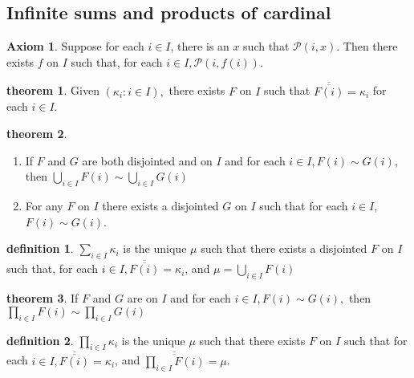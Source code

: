 \documentclass[a4paper,11pt]{article}%
\theoremstyle{remark}
\theoremstyle{definition}
\newtheorem{theorem}{theorem}[section]
\theoremstyle{definition}
\newtheorem*{definition}{definition}
\theoremstyle{plain}
\theoremstyle{definition}
\newtheorem{axiom}{Axiom}
\begin{document}
\subsection{Infinite sums and products of cardinal}
\begin{axiom}
    Suppose for each $i\in I$, there is an $x$ such that $\mathcal{P}(i,x)$.
    Then there exists $f$ on $I$ such that, for each $i\in I,\mathcal{P}(i,f(i))$.
\end{axiom}
\begin{theorem}
    Given $(\kappa_i:i\in I),$ there exists $F$ on $I$ such that $\overline{\overline{F(i)}}=\kappa_i$ for each $i\in I$.
\end{theorem}
\begin{theorem}
    \begin{enumerate}
        \item If $F$ and $G$ are both disjointed and on $I$ and for each $i\in I, F(i)\sim G(i)$,
        then $\bigcup_{i\in I}F(i)\sim \bigcup_{i\in I}G(i)$
        \item For any $F$ on $I$ there exists a disjointed $G$ on $I$ such that for each $i\in I$,$F(i)\sim G(i)$.
    \end{enumerate}
\end{theorem}
\begin{definition}
    $\sum_{i\in I}\kappa_i$ is the unique $\mu$ such that there exists a disjointed $F$ on $I$ 
    such that, for each $i\in I,\overline{\overline{F(i)}}=\kappa_i$, and $\mu=\bigcup_{i\in I}F(i)$
\end{definition}
\begin{theorem}
    If $F$ and $G$ are on $I $ and for each $i\in I, F(i)\sim G(i), $ then $\prod_{i\in I}F(i)\sim \prod_{i\in I}G(i)$
\end{theorem}
\begin{definition}
    $\prod_{i\in I}\kappa_i$ is the unique $\mu$ such that there exists $F$ on $I$ such that for each $i\in I, \overline{\overline{F(i)}}=\kappa_i$,
    and $\overline{\overline{\prod_{i\in I}F(i)}}=\mu$.
\end{definition}
\end{document}
